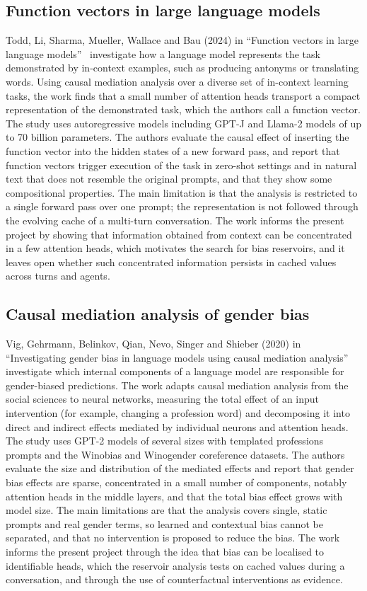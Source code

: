 \subsection{Function vectors in large language models}\label{lit:fv}
Todd, Li, Sharma, Mueller, Wallace and Bau (2024) in ``Function vectors in large language models''~\cite{todd2024fv} investigate how a language model represents the task demonstrated by in-context examples, such as producing antonyms or translating words. Using causal mediation analysis over a diverse set of in-context learning tasks, the work finds that a small number of attention heads transport a compact representation of the demonstrated task, which the authors call a function vector. The study uses autoregressive models including GPT-J and Llama-2 models of up to 70 billion parameters. The authors evaluate the causal effect of inserting the function vector into the hidden states of a new forward pass, and report that function vectors trigger execution of the task in zero-shot settings and in natural text that does not resemble the original prompts, and that they show some compositional properties. The main limitation is that the analysis is restricted to a single forward pass over one prompt; the representation is not followed through the evolving cache of a multi-turn conversation. The work informs the present project by showing that information obtained from context can be concentrated in a few attention heads, which motivates the search for bias reservoirs, and it leaves open whether such concentrated information persists in cached values across turns and agents.

\subsection{Causal mediation analysis of gender bias}\label{lit:vig}
Vig, Gehrmann, Belinkov, Qian, Nevo, Singer and Shieber (2020) in ``Investigating gender bias in language models using causal mediation analysis''~\cite{vig2020causal} investigate which internal components of a language model are responsible for gender-biased predictions. The work adapts causal mediation analysis from the social sciences to neural networks, measuring the total effect of an input intervention (for example, changing a profession word) and decomposing it into direct and indirect effects mediated by individual neurons and attention heads. The study uses GPT-2 models of several sizes with templated professions prompts and the Winobias and Winogender coreference datasets. The authors evaluate the size and distribution of the mediated effects and report that gender bias effects are sparse, concentrated in a small number of components, notably attention heads in the middle layers, and that the total bias effect grows with model size. The main limitations are that the analysis covers single, static prompts and real gender terms, so learned and contextual bias cannot be separated, and that no intervention is proposed to reduce the bias. The work informs the present project through the idea that bias can be localised to identifiable heads, which the reservoir analysis tests on cached values during a conversation, and through the use of counterfactual interventions as evidence.

